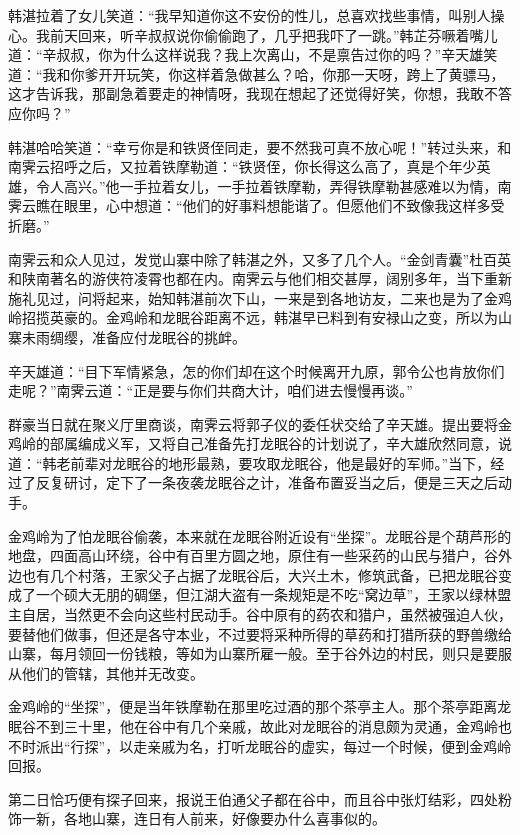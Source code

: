 \documentclass[12pt,oneside]{book}
\begin{document}
韩湛拉着了女儿笑道：``我早知道你这不安份的性儿，总喜欢找些事情，叫别人操心。我前天回来，听辛叔叔说你偷偷跑了，几乎把我吓了一跳。''韩芷芬噘着嘴儿道：``辛叔叔，你为什么这样说我？我上次离山，不是禀告过你的吗？''辛天雄笑道：``我和你爹开开玩笑，你这样着急做甚么？哈，你那一天呀，跨上了黄骠马，这才告诉我，那副急着要走的神情呀，我现在想起了还觉得好笑，你想，我敢不答应你吗？''

韩湛哈哈笑道：``幸亏你是和铁贤侄同走，要不然我可真不放心呢！''转过头来，和南霁云招呼之后，又拉着铁摩勒道：``铁贤侄，你长得这么高了，真是个年少英雄，令人高兴。''他一手拉着女儿，一手拉着铁摩勒，弄得铁摩勒甚感难以为情，南霁云瞧在眼里，心中想道：``他们的好事料想能谐了。但愿他们不致像我这样多受折磨。''

南霁云和众人见过，发觉山寨中除了韩湛之外，又多了几个人。``金剑青囊''杜百英和陕南著名的游侠符凌霄也都在内。南霁云与他们相交甚厚，阔别多年，当下重新施礼见过，问将起来，始知韩湛前次下山，一来是到各地访友，二来也是为了金鸡岭招揽英豪的。金鸡岭和龙眠谷距离不远，韩湛早已料到有安禄山之变，所以为山寨未雨绸缨，准备应付龙眠谷的挑衅。

辛天雄道：``目下军情紧急，怎的你们却在这个时候离开九原，郭令公也肯放你们走呢？''南霁云道：``正是要与你们共商大计，咱们进去慢慢再谈。''

群豪当日就在聚义厅里商谈，南霁云将郭子仪的委任状交给了辛天雄。提出要将金鸡岭的部属编成义军，又将自己准备先打龙眠谷的计划说了，辛大雄欣然同意，说道：``韩老前辈对龙眠谷的地形最熟，要攻取龙眠谷，他是最好的军师。''当下，经过了反复研讨，定下了一条夜袭龙眠谷之计，准备布置妥当之后，便是三天之后动手。

金鸡岭为了怕龙眠谷偷袭，本来就在龙眠谷附近设有``坐探''。龙眠谷是个葫芦形的地盘，四面高山环绕，谷中有百里方圆之地，原住有一些采药的山民与猎户，谷外边也有几个村落，王家父子占据了龙眠谷后，大兴土木，修筑武备，已把龙眠谷变成了一个硕大无朋的碉堡，但江湖大盗有一条规矩是不吃``窝边草''，王家以绿林盟主自居，当然更不会向这些村民动手。谷中原有的药农和猎户，虽然被强迫人伙，要替他们做事，但还是各守本业，不过要将采种所得的草药和打猎所获的野兽缴给山寨，每月领回一份钱粮，等如为山寨所雇一般。至于谷外边的村民，则只是要服从他们的管辖，其他并无改变。

金鸡岭的``坐探''，便是当年铁摩勒在那里吃过酒的那个茶亭主人。那个茶亭距离龙眠谷不到三十里，他在谷中有几个亲戚，故此对龙眠谷的消息颇为灵通，金鸡岭也不时派出``行探''，以走亲戚为名，打听龙眠谷的虚实，每过一个时候，便到金鸡岭回报。

第二日恰巧便有探子回来，报说王伯通父子都在谷中，而且谷中张灯结彩，四处粉饰一新，各地山寨，连日有人前来，好像要办什么喜事似的。
\end{document}
